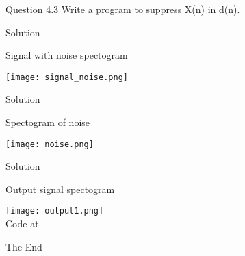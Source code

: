 \documentclass{beamer}
\begin{document}
\begin{frame}{Question 4.3}
Write a program to suppress X(n) in d(n).    
\end{frame}
\begin{frame}{Solution}
\begin{center}
    Signal with noise spectogram
\end{center}
\texttt{[image: signal\_noise.png]}
    
\end{frame}
\begin{frame}{Solution}
\begin{center}
     Spectogram of noise
\end{center}
\texttt{[image: noise.png]}
    
\end{frame}

\begin{frame}{Solution}
\begin{center}
    Output signal spectogram
\end{center}
\texttt{[image: output1.png]}
    \\ Code at 
    
\end{frame}


\begin{frame}
\Huge{\centerline{The End}}
\end{frame}

\end{document}
